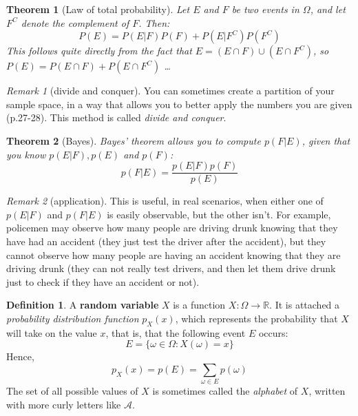 \documentclass{article}
\theoremstyle{plain}
\newtheorem{thm}{Theorem}
\theoremstyle{definition}
\newtheorem{defn}{Definition}
\theoremstyle{remark}
\newtheorem*{remark}{Remark}
\begin{document}
\begin{thm}[Law of total probability]
Let $E$ and $F$ be two events in $\Omega$, and let $F^C$ denote the complement of $F$. Then:
\begin{equation}
	P(E) = P(E|F)P(F) + P(E|F^C)P(F^C)
\end{equation}
This follows quite directly from the fact that $E = (E \cap F) \cup (E \cap F^C)$, so $P(E) = P(E \cap F) + P(E \cap F^C)$ \dots 
\end{thm}

\begin{remark}[divide and conquer] You can sometimes create a partition of your sample space, in a way that allows you to better apply the numbers you are given (p.27-28). This method is called \emph{divide and conquer}.
\end{remark}

\begin{thm}[Bayes]
Bayes' theorem allows you to compute $p(F|E)$, given that you know $p(E|F), p(E)$ and $p(F)$:
\begin{equation}
	p(F|E) = \dfrac{p(E|F)p(F)}{p(E)}
\end{equation}
\end{thm}

\begin{remark}[application] This is useful, in real scenarios, when either one of $p(E|F)$ and $p(F|E)$ is easily observable, but the other isn't. For example, policemen may observe how many people are driving drunk knowing that they have had an accident (they just test the driver after the accident), but they cannot observe how many people are having an accident knowing that they are driving drunk (they can not really test drivers, and then let them drive drunk just to check if they have an accident or not).
\end{remark}

\begin{defn}
A \textbf{random variable} $X$ is a function $X: \Omega \to \mathbb{R}$. It is attached a \emph{probability distribution function} $p_X(x)$, which represents the probability that $X$ will take on the value $x$, that is, that the following event $E$ occurs:
\begin{equation}
	E = \{\omega \in \Omega : X(\omega) = x\}
\end{equation}
Hence,
\begin{equation}
	p_X(x) = p(E) = \sum_{\omega \in E} p(\omega)
\end{equation}
The set of all possible values of $X$ is sometimes called the \emph{alphabet} of $X$, written with more curly letters like $\mathcal A$.
\end{defn}
\end{document}
